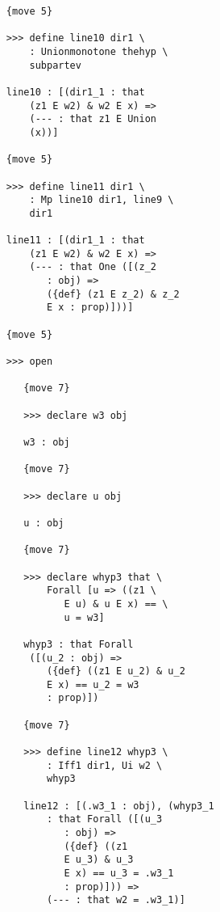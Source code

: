 \documentclass[12pt]{article}
\begin{document}
\begin{verbatim}
                  {move 5}

                  >>> define line10 dir1 \
                      : Unionmonotone thehyp \
                      subpartev

                  line10 : [(dir1_1 : that 
                      (z1 E w2) & w2 E x) => 
                      (--- : that z1 E Union 
                      (x))]

                  {move 5}

                  >>> define line11 dir1 \
                      : Mp line10 dir1, line9 \
                      dir1

                  line11 : [(dir1_1 : that 
                      (z1 E w2) & w2 E x) => 
                      (--- : that One ([(z_2 
                         : obj) => 
                         ({def} (z1 E z_2) & z_2 
                         E x : prop)]))]

                  {move 5}

                  >>> open

                     {move 7}

                     >>> declare w3 obj

                     w3 : obj

                     {move 7}

                     >>> declare u obj

                     u : obj

                     {move 7}

                     >>> declare whyp3 that \
                         Forall [u => ((z1 \
                            E u) & u E x) == \
                            u = w3]

                     whyp3 : that Forall 
                      ([(u_2 : obj) => 
                         ({def} ((z1 E u_2) & u_2 
                         E x) == u_2 = w3 
                         : prop)])

                     {move 7}

                     >>> define line12 whyp3 \
                         : Iff1 dir1, Ui w2 \
                         whyp3

                     line12 : [(.w3_1 : obj), (whyp3_1 
                         : that Forall ([(u_3 
                            : obj) => 
                            ({def} ((z1 
                            E u_3) & u_3 
                            E x) == u_3 = .w3_1 
                            : prop)])) => 
                         (--- : that w2 = .w3_1)]


\end{verbatim}
\end{document}
